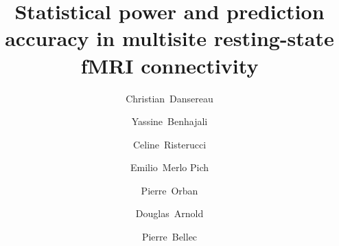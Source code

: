 \documentclass[authoryear]{elsarticle}
\begin{document}
\begin{frontmatter}
\title{Statistical power and prediction accuracy in multisite resting-state fMRI connectivity}

\author[a,b]{Christian~Dansereau}
\author[a,c]{Yassine~Benhajali}
\author[d]{Celine~Risterucci}
\author[d]{Emilio~Merlo Pich}
\author[a]{Pierre~Orban}
\author[e]{Douglas~Arnold}
\author[a,b]{Pierre~Bellec}
\address[a]{Centre de Recherche de l'Institut Universitaire de G\'eriatrie de Montr\'eal, Montr\'eal, CA}
\address[b]{Department of Computer Science and Operations Research, University of Montreal, Montreal, CA}
\address[c]{D\'epartement d'anthropologie, Universit\' de Montr\'eal, Montr\'eal, CA}
\address[d]{Clinical Imaging, pRED, F.Hoffman-La Roche, Basel, CH}
\address[e]{NeuroRx inc., Montr\'eal, CA}


%


\end{frontmatter}
\end{document}
